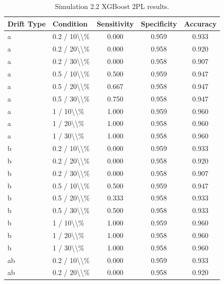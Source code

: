 \begin{table}[!h]
\centering
\caption{\label{tab:tab:sim22_xgb_2pl}Simulation 2.2 XGBoost 2PL results.}
\centering
\begin{tabular}[t]{llccc}
\toprule
Drift Type & Condition & Sensitivity & Specificity & Accuracy\\
\midrule
a & 0.2 / 10\textbackslash{}\textbackslash{}\% & 0.000 & 0.959 & 0.933\\
a & 0.2 / 20\textbackslash{}\textbackslash{}\% & 0.000 & 0.958 & 0.920\\
a & 0.2 / 30\textbackslash{}\textbackslash{}\% & 0.000 & 0.958 & 0.907\\
a & 0.5 / 10\textbackslash{}\textbackslash{}\% & 0.500 & 0.959 & 0.947\\
a & 0.5 / 20\textbackslash{}\textbackslash{}\% & 0.667 & 0.958 & 0.947\\
\addlinespace
a & 0.5 / 30\textbackslash{}\textbackslash{}\% & 0.750 & 0.958 & 0.947\\
a & 1 / 10\textbackslash{}\textbackslash{}\% & 1.000 & 0.959 & 0.960\\
a & 1 / 20\textbackslash{}\textbackslash{}\% & 1.000 & 0.958 & 0.960\\
a & 1 / 30\textbackslash{}\textbackslash{}\% & 1.000 & 0.958 & 0.960\\
b & 0.2 / 10\textbackslash{}\textbackslash{}\% & 0.000 & 0.959 & 0.933\\
\addlinespace
b & 0.2 / 20\textbackslash{}\textbackslash{}\% & 0.000 & 0.958 & 0.920\\
b & 0.2 / 30\textbackslash{}\textbackslash{}\% & 0.000 & 0.958 & 0.907\\
b & 0.5 / 10\textbackslash{}\textbackslash{}\% & 0.500 & 0.959 & 0.947\\
b & 0.5 / 20\textbackslash{}\textbackslash{}\% & 0.333 & 0.958 & 0.933\\
b & 0.5 / 30\textbackslash{}\textbackslash{}\% & 0.500 & 0.958 & 0.933\\
\addlinespace
b & 1 / 10\textbackslash{}\textbackslash{}\% & 1.000 & 0.959 & 0.960\\
b & 1 / 20\textbackslash{}\textbackslash{}\% & 1.000 & 0.958 & 0.960\\
b & 1 / 30\textbackslash{}\textbackslash{}\% & 1.000 & 0.958 & 0.960\\
ab & 0.2 / 10\textbackslash{}\textbackslash{}\% & 0.000 & 0.959 & 0.933\\
ab & 0.2 / 20\textbackslash{}\textbackslash{}\% & 0.000 & 0.958 & 0.920\\

\end{tabular}
\end{table}
